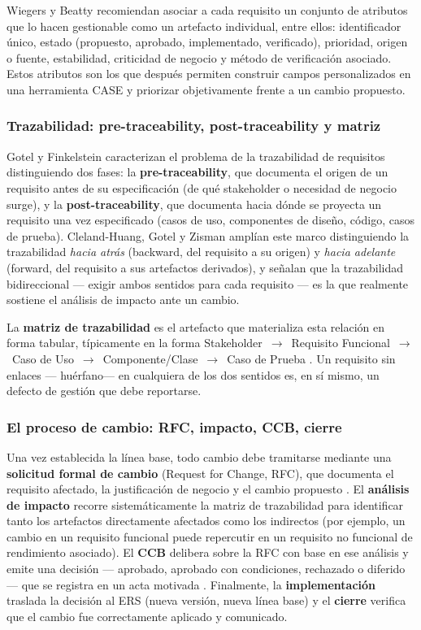 \documentclass[11pt,a4paper]{article}
\begin{document}
Wiegers y Beatty \cite{wiegers2013} recomiendan asociar a cada requisito un
conjunto de atributos que lo hacen gestionable como un artefacto
individual, entre ellos: identificador único, estado (propuesto,
aprobado, implementado, verificado), prioridad, origen o fuente,
estabilidad, criticidad de negocio y método de verificación asociado.
Estos atributos son los que después permiten construir campos
personalizados en una herramienta CASE y priorizar objetivamente frente a
un cambio propuesto.
 
\subsubsection{Trazabilidad: pre-traceability, post-traceability y matriz}
 
Gotel y Finkelstein \cite{gotel1994} caracterizan el problema de la
trazabilidad de requisitos distinguiendo dos fases: la
\textbf{pre-traceability}, que documenta el origen de un requisito antes
de su especificación (de qué stakeholder o necesidad de negocio surge), y
la \textbf{post-traceability}, que documenta hacia dónde se proyecta un
requisito una vez especificado (casos de uso, componentes de diseño,
código, casos de prueba). Cleland-Huang, Gotel y Zisman
\cite{cleland2012} amplían este marco distinguiendo la trazabilidad
\emph{hacia atrás} (backward, del requisito a su origen) y \emph{hacia
adelante} (forward, del requisito a sus artefactos derivados), y señalan
que la trazabilidad bidireccional --- exigir ambos sentidos para cada
requisito --- es la que realmente sostiene el análisis de impacto ante un
cambio.
 
La \textbf{matriz de trazabilidad} es el artefacto que materializa esta
relación en forma tabular, típicamente en la forma
Stakeholder~$\rightarrow$~Requisito Funcional~$\rightarrow$~Caso de
Uso~$\rightarrow$~Componente/Clase~$\rightarrow$~Caso de Prueba
\cite{wiegers2013, cleland2012}. Un requisito sin enlaces --- huérfano---
en cualquiera de los dos sentidos es, en sí mismo, un defecto de gestión
que debe reportarse.
 
\subsubsection{El proceso de cambio: RFC, impacto, CCB, cierre}
 
Una vez establecida la línea base, todo cambio debe tramitarse mediante
una \textbf{solicitud formal de cambio} (Request for Change, RFC), que
documenta el requisito afectado, la justificación de negocio y el cambio
propuesto \cite{pmbok7, iso12207_2017}. El \textbf{análisis de impacto}
recorre sistemáticamente la matriz de trazabilidad para identificar tanto
los artefactos directamente afectados como los indirectos (por ejemplo, un
cambio en un requisito funcional puede repercutir en un requisito no
funcional de rendimiento asociado). El \textbf{CCB} delibera sobre la RFC
con base en ese análisis y emite una decisión --- aprobado, aprobado con
condiciones, rechazado o diferido--- que se registra en un acta motivada
\cite{pmbok7}. Finalmente, la \textbf{implementación} traslada la decisión
al ERS (nueva versión, nueva línea base) y el \textbf{cierre} verifica que
el cambio fue correctamente aplicado y comunicado.
 
\end{document}
